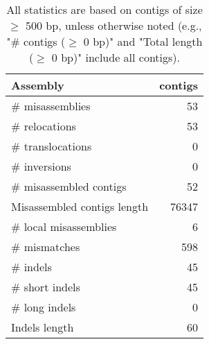 \documentclass[12pt,a4paper]{article}
\begin{document}
\begin{table}[ht]
\begin{center}
\caption{All statistics are based on contigs of size $\geq$ 500 bp, unless otherwise noted (e.g., "\# contigs ($\geq$ 0 bp)" and "Total length ($\geq$ 0 bp)" include all contigs).}
\begin{tabular}{|l*{1}{|r}|}
\hline
Assembly & contigs \\ \hline
\# misassemblies & 53 \\ \hline
\hspace{5mm}\# relocations & 53 \\ \hline
\hspace{5mm}\# translocations & 0 \\ \hline
\hspace{5mm}\# inversions & 0 \\ \hline
\# misassembled contigs & 52 \\ \hline
Misassembled contigs length & 76347 \\ \hline
\# local misassemblies & 6 \\ \hline
\# mismatches & 598 \\ \hline
\# indels & 45 \\ \hline
\hspace{5mm}\# short indels & 45 \\ \hline
\hspace{5mm}\# long indels & 0 \\ \hline
Indels length & 60 \\ \hline
\end{tabular}
\end{center}
\end{table}
\end{document}
